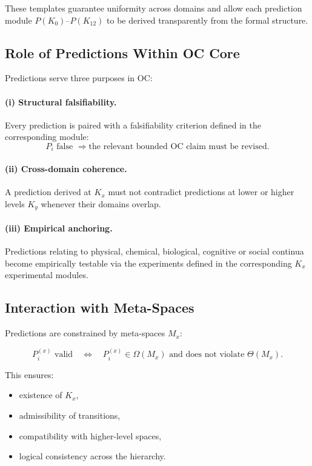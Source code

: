 These templates guarantee uniformity across domains  
and allow each prediction module $P(K_0)$–$P(K_{12})$  
to be derived transparently from the formal structure.

\subsection{Role of Predictions Within OC Core}

Predictions serve three purposes in OC:

\paragraph{(i) Structural falsifiability.}
Every prediction is paired with a falsifiability criterion  
defined in the corresponding module:
\[
P_i \text{ false } \Rightarrow \text{the relevant bounded OC claim must be revised}.
\]

\paragraph{(ii) Cross-domain coherence.}
A prediction derived at $K_x$ must not contradict predictions at  
lower or higher levels $K_y$ whenever their domains overlap.

\paragraph{(iii) Empirical anchoring.}
Predictions relating to physical, chemical, biological, cognitive or  
social continua become empirically testable via the experiments  
defined in the corresponding $K_x$ experimental modules.

\subsection{Interaction with Meta-Spaces}

Predictions are constrained by meta-spaces $M_x$:

\[
P^{(x)}_i \text{ valid}
\quad\Leftrightarrow\quad
P^{(x)}_i \in \Omega(M_x) \text{ and does not violate } \Theta(M_x).
\]

This ensures:

\begin{itemize}
    \item existence of $K_x$,
    \item admissibility of transitions,
    \item compatibility with higher-level spaces,
    \item logical consistency across the hierarchy.
\end{itemize}

